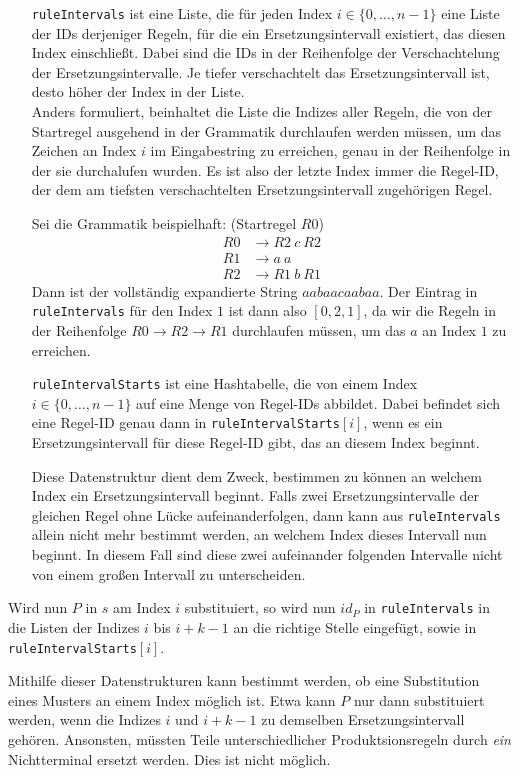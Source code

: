 \begin{itemize}[leftmargin=10em]
	\item[\texttt{ruleIntervals}] ist eine Liste, die für jeden Index $i \in \{0, \dots, n - 1\}$ eine Liste der IDs derjeniger Regeln, für die ein Ersetzungsintervall existiert, das diesen Index einschließt. Dabei sind die IDs in der Reihenfolge der Verschachtelung der Ersetzungsintervalle. Je tiefer verschachtelt das Ersetzungsintervall ist, desto höher der Index in der Liste.\\ 
	Anders formuliert, beinhaltet die Liste die Indizes aller Regeln, die von der Startregel ausgehend in der Grammatik durchlaufen werden müssen, um das Zeichen an Index $i$ im Eingabestring zu erreichen, genau in der Reihenfolge in der sie durchalufen wurden. Es ist also der letzte Index immer die Regel-ID, der dem am tiefsten verschachtelten Ersetzungsintervall zugehörigen Regel. 
	
	Sei die Grammatik beispielhaft: (Startregel $R0$)
	\begin{align*}
		R0 &\rightarrow R2\ c\ R2\\
		R1 &\rightarrow a\ a\\
		R2 &\rightarrow R1\ b\ R1
	\end{align*}
	Dann ist der vollständig expandierte String $aabaacaabaa$. Der Eintrag in \texttt{ruleIntervals} für den Index $1$ ist dann also $[0, 2, 1]$, da wir die Regeln in der Reihenfolge $R0 \rightarrow R2 \rightarrow R1$ durchlaufen müssen, um das $a$ an Index $1$ zu erreichen.
	
	\item[\texttt{ruleIntervalStarts}] ist eine Hashtabelle, die von einem Index $i \in \{0, \dots, n - 1\}$ auf eine Menge von Regel-IDs abbildet. Dabei befindet sich eine Regel-ID genau dann in \texttt{ruleIntervalStarts}$[i]$, wenn es ein Ersetzungsintervall für diese Regel-ID gibt, das an diesem Index beginnt.
	
	Diese Datenstruktur dient dem Zweck, bestimmen zu können an welchem Index ein Ersetzungsintervall beginnt. Falls zwei Ersetzungsintervalle der gleichen Regel ohne Lücke aufeinanderfolgen, dann kann aus \texttt{ruleIntervals} allein nicht mehr bestimmt werden, an welchem Index dieses Intervall nun beginnt. In diesem Fall sind diese zwei aufeinander folgenden Intervalle nicht von einem großen Intervall zu unterscheiden.
\end{itemize}

Wird nun $P$ in $s$ am Index $i$ substituiert, so wird nun $id_P$ in \texttt{ruleIntervals} in die Listen der Indizes $i$ bis $i + k - 1$ an die richtige Stelle eingefügt, sowie in \texttt{ruleIntervalStarts}$[i]$.

Mithilfe dieser Datenstrukturen kann bestimmt werden, ob eine Substitution eines Musters an einem Index möglich ist. Etwa kann $P$ nur dann substituiert werden, wenn die Indizes $i$ und $i + k - 1$ zu demselben Ersetzungsintervall gehören. Ansonsten, müssten Teile unterschiedlicher Produktsionsregeln durch \textit{ein} Nichtterminal ersetzt werden. Dies ist nicht möglich.

